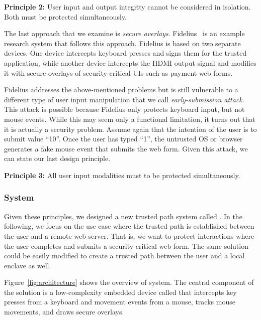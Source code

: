\begin{tcolorbox}
\textbf{Principle 2:} User input and output integrity cannot be considered in isolation. Both must be protected simultaneously.
\end{tcolorbox}

The last approach that we examine is \emph{secure overlays}. Fidelius~\cite{Fidelius} is an example research system that follows this approach. Fidelius is based on two separate devices. One device intercepts keyboard presses and signs them for the trusted application, while another device intercepts the HDMI output signal and modifies it with secure overlays of security-critical UIs such as payment web forms. 

Fidelius addresses the above-mentioned problems but is still vulnerable to a different type of user input manipulation that we call \emph{early-submission attack}. This attack is possible because Fidelius only protects keyboard input, but not mouse events. While this may seem only a functional limitation, it turns out that it is actually a security problem. Assume again that the intention of the user is to submit value ``10''. Once the user has typed ``1'', the untrusted OS or browser generates a fake mouse event that submits the web form. Given this attack, we can state our last design principle.

\begin{tcolorbox}
\textbf{Principle 3:} All user input modalities must to be protected simultaneously.
\end{tcolorbox}


\subsubsection*{\protection System}

Given these principles, we designed a new trusted path system called \protection. In the following, we focus on the use case where the trusted path is established between the user and a remote web server. That is, we want to protect interactions where the user completes and submits a security-critical web form. The same solution could be easily modified to create a trusted path between the user and a local enclave as well.

Figure~\ref{fig:architecture} shows the overview of \protection system. The central component of the solution is a low-complexity embedded device called \hub that intercepts key presses from a keyboard and movement events from a mouse, tracks mouse movements, and draws secure overlays. 


